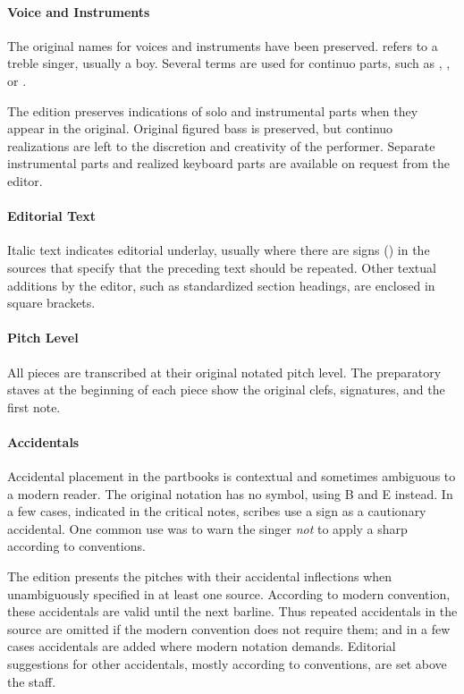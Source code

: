 \paragraph{Voice and Instruments}
The original names for voices and instruments have been preserved. 
 refers to a treble singer, usually a boy.
Several terms are used for continuo parts, such as ,
, or .

The edition preserves indications of solo and instrumental parts when they
appear in the original.
Original figured bass is preserved, but continuo realizations are left to the
discretion and creativity of the performer.
Separate instrumental parts and realized keyboard parts are available on request
from the editor.

\paragraph{Editorial Text}
Italic text indicates editorial underlay, usually where there are signs
(\MSrepeat{}) in the sources that specify that the preceding text should
be repeated.
Other textual additions by the editor, such as standardized section headings, 
are enclosed in square brackets.

\paragraph{Pitch Level}
All pieces are transcribed at their original notated pitch level.
The preparatory staves at the beginning of each piece show the original clefs, 
signatures, and the first note.

\paragraph{Accidentals}
Accidental placement in the partbooks is contextual and sometimes ambiguous to 
a modern reader.
The original notation has no \na{} symbol, using B\sh{} and E\sh{} instead.
In a few cases, indicated in the critical notes, scribes use a \sh{} sign as a 
cautionary accidental.
One common use was to warn the singer \emph{not} to apply a sharp according 
to  conventions.%
  \autocites{Harran:Cautionary1}{Harran:Cautionary2}

The edition presents the pitches with their accidental inflections when 
unambiguously specified in at least one source.
According to modern convention, these accidentals are valid until the next 
barline.
Thus repeated accidentals in the source are omitted if the modern convention 
does not require them; and in a few cases accidentals are added where modern 
notation demands.
Editorial suggestions for other accidentals, mostly according to  conventions, are set above the staff.

